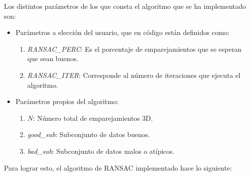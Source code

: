 Los distintos parámetros de los que consta el algoritmo que se ha implementado son:

\begin{itemize}
\item Parámetros a elección del usuario, que en código están definidos como:

\begin{enumerate}
\item \textit{RANSAC\_PERC}: Es el porcentaje de emparejamientos que se esperan que sean buenos.
\item \textit{RANSAC\_ITER}: Corresponde al número de iteraciones que ejecuta el algoritmo.
\end{enumerate}
\item Parámetros propios del algoritmo:

\begin{enumerate}
\item $N$: Número total de emparejamientos 3D.
\item \textit{good\_sub}: Subconjunto de datos buenos.
\item \textit{bad\_sub}: Subconjunto de datos malos o atípicos.
\end{enumerate}
\end{itemize}

Para lograr esto, el algoritmo de RANSAC implementado hace lo siguiente:

